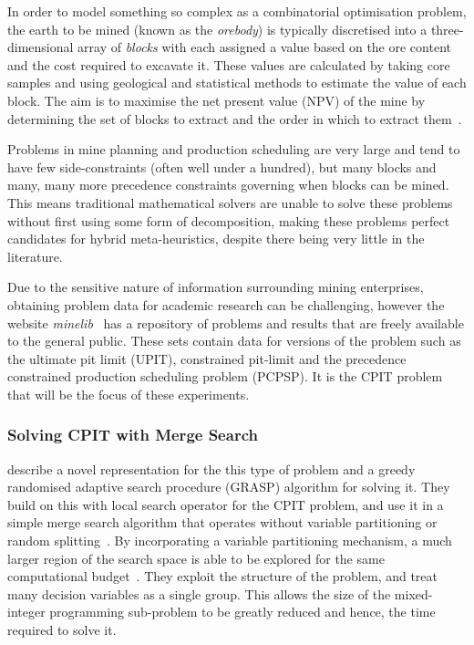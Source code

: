 \documentclass[authoryear,11pt,square,number,times,super,comma]{elsarticle}
\begin{document}
In order to model something so complex as a combinatorial optimisation problem, the earth to be mined (known as the \emph{orebody}) is typically discretised into a three-dimensional array of \emph{blocks} with each assigned a value based on the ore content and the cost required to excavate it. These values are calculated by taking core samples and using geological and statistical methods to estimate the value of each block. The aim is to maximise the net present value (NPV) of the mine by determining the set of blocks to extract and the order in which to extract them~\citep{Meagher2014}.\par

Problems in mine planning and production scheduling are very large and tend to have few side-constraints (often well under a hundred), but many blocks and many, many more precedence constraints governing when blocks can be mined. This means traditional mathematical solvers are unable to solve these problems without first using some form of decomposition, making these problems perfect candidates for hybrid meta-heuristics, despite there being very little in the literature.\par

Due to the sensitive nature of information surrounding mining enterprises, obtaining problem data for academic research can be challenging, however the website \emph{minelib}~\citep{espinoza_minelib:_2012} has a repository of problems and results that are freely available to the general public. These sets contain data for versions of the problem such as the ultimate pit limit (UPIT), constrained pit-limit and the precedence constrained production scheduling problem (PCPSP). It is the CPIT problem that will be the focus of these experiments.\par

\subsubsection{Solving CPIT with Merge Search}

\cite{Kenny:2017} describe a novel representation for the this type of problem and a greedy randomised adaptive search procedure (GRASP) algorithm for solving it. They build on this with local search operator for the CPIT problem, and use it in a simple merge search algorithm that operates without variable partitioning or random splitting~\citep{Kenny:2018}. By incorporating a variable partitioning mechanism, a much larger region of the search space is able to be explored for the same computational budget~\citep{Kenny:2019}. They exploit the structure of the problem, and treat many decision variables as a single group. This allows the size of the mixed-integer programming sub-problem to be greatly reduced and hence, the time required to solve it.\par
\end{document}
